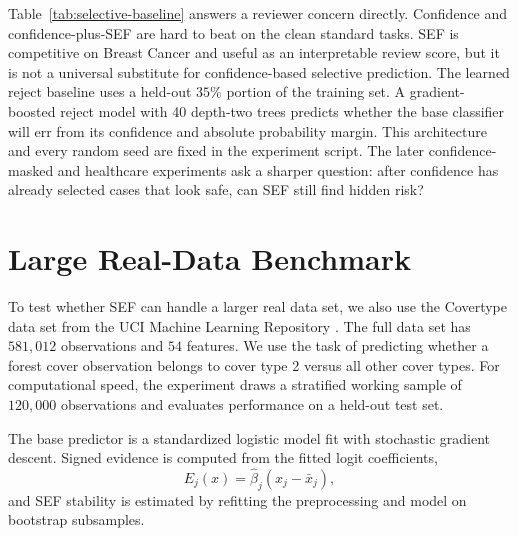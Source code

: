 \documentclass[11pt]{article}
\begin{document}
\begin{table}[!htbp]
\centering
\caption{Selective-review comparison at a fixed 30\% review budget across 50 splits. Lower values are better. The learned reject baseline is trained on a held-out part of the training data to predict whether the base classifier will make a mistake.}
\label{tab:selective-baseline}
\resizebox{\textwidth}{!}{}
\end{table}

Table~\ref{tab:selective-baseline} answers a reviewer concern directly. Confidence and confidence-plus-SEF are hard to beat on the clean standard tasks. SEF is competitive on Breast Cancer and useful as an interpretable review score, but it is not a universal substitute for confidence-based selective prediction. The learned reject baseline uses a held-out $35\%$ portion of the training set. A gradient-boosted reject model with 40 depth-two trees predicts whether the base classifier will err from its confidence and absolute probability margin. This architecture and every random seed are fixed in the experiment script. The later confidence-masked and healthcare experiments ask a sharper question: after confidence has already selected cases that look safe, can SEF still find hidden risk?

\FloatBarrier

\section{Large Real-Data Benchmark}

To test whether SEF can handle a larger real data set, we also use the Covertype data set from the UCI Machine Learning Repository \citep{blackard1998covtype}. The full data set has $581{,}012$ observations and $54$ features. We use the task of predicting whether a forest cover observation belongs to cover type 2 versus all other cover types. For computational speed, the experiment draws a stratified working sample of $120{,}000$ observations and evaluates performance on a held-out test set.

The base predictor is a standardized logistic model fit with stochastic gradient descent. Signed evidence is computed from the fitted logit coefficients,
\[
E_j(x)=\widehat{\beta}_j(x_j-\bar{x}_j),
\]
and SEF stability is estimated by refitting the preprocessing and model on bootstrap subsamples.

\begin{table}[!htbp]
\centering
\caption{Covertype benchmark with 95\% nonparametric bootstrap confidence intervals computed on the held-out test predictions.}
\label{tab:covtype-ci}

\end{table}
\end{document}
